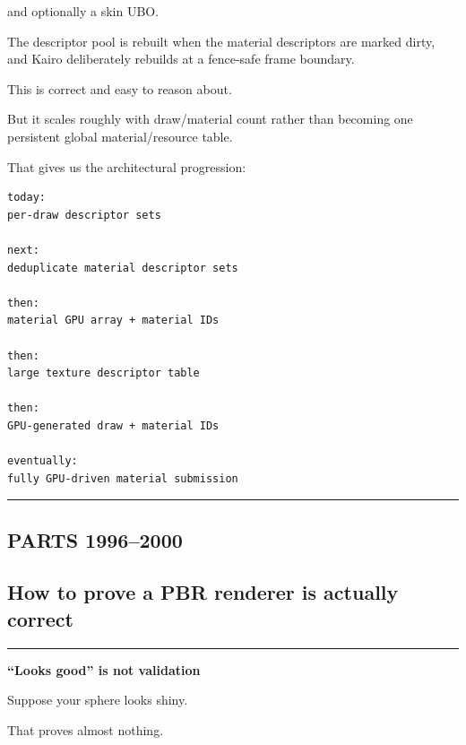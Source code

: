 and optionally a skin UBO.

The descriptor pool is rebuilt when the material descriptors are marked dirty, and Kairo deliberately rebuilds at a fence-safe frame boundary.

This is correct and easy to reason about.

But it scales roughly with draw/material count rather than becoming one persistent global material/resource table.

That gives us the architectural progression:

\begin{verbatim}
today:
per-draw descriptor sets

next:
deduplicate material descriptor sets

then:
material GPU array + material IDs

then:
large texture descriptor table

then:
GPU-generated draw + material IDs

eventually:
fully GPU-driven material submission
\end{verbatim}

\begin{center}\rule{0.5\linewidth}{0.5pt}\end{center}

\subsection{PARTS 1996--2000}\label{03-visual-computing-i-ch006-parts-19962000}

\hypertarget{03-visual-computing-i-ch006-parts-19962000}{}

\subsection{How to prove a PBR renderer is actually correct}\label{03-visual-computing-i-ch006-how-to-prove-a-pbr-renderer-is-actually-correct}

\hypertarget{03-visual-computing-i-ch006-how-to-prove-a-pbr-renderer-is-actually-correct}{}

\begin{center}\rule{0.5\linewidth}{0.5pt}\end{center}

\textbf{``Looks good'' is not validation}

Suppose your sphere looks shiny.

That proves almost nothing.

